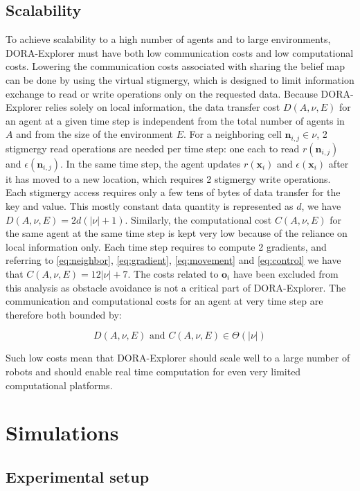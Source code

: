 \documentclass[letterpaper, 10 pt, conference]{ieeeconf}
\begin{document}
\subsection{Scalability}
\label{subsec:scalability}
To achieve scalability to a high number of agents and to large
environments, DORA-Explorer must have both low communication costs and
low computational costs. Lowering the communication costs associated
with sharing the belief map can be done by using the virtual
stigmergy, which is designed to limit information exchange to read or
write operations only on the requested data. Because DORA-Explorer relies
solely on local information, the data transfer cost $D(A, \nu, E)$ for
an agent at a given time step is independent from the total number of
agents in $A$ and from the size of the environment $E$. For a
neighboring cell $\bm{n}_{i,j} \in \nu$, 2 stigmergy read operations
are needed per time step: one each to read $r(\bm{n}_{i,j})$ and
$\epsilon(\bm{n}_{i,j})$. In the same time step, the agent updates
$r(\bm{x}_i)$ and $\epsilon(\bm{x}_i)$ after it has moved to a new
location, which requires 2 stigmergy write operations. Each stigmergy
access requires only a few tens of bytes of data transfer for the key
and value. This mostly constant data quantity is represented as $d$,
we have $D(A, \nu, E) = 2d(|\nu| + 1)$. Similarly, the computational
cost $C(A, \nu, E)$ for the same agent at the same time step is kept
very low because of the reliance on local information only. Each time
step requires to compute 2 gradients, and referring to
\eqref{eq:neighbor}, \eqref{eq:gradient}, \eqref{eq:movement} and
\eqref{eq:control} we have that $C(A, \nu, E) = 12|\nu|+7$. The costs
related to $\bm{o}_i$ have been excluded from this analysis as
obstacle avoidance is not a critical part of DORA-Explorer. The communication
and computational costs for an agent at very time step are therefore
both bounded by:

\begin{equation}
    D(A, \nu, E) \text{ and } C(A, \nu, E) \in \Theta(|\nu|)
    \label{eq:costs}
\end{equation}

Such low costs mean that DORA-Explorer should scale well to a large number of
robots and should enable real time computation for even very limited computational platforms.


\section{Simulations}
\subsection{Experimental setup}
\label{experimentSetup}
\end{document}
